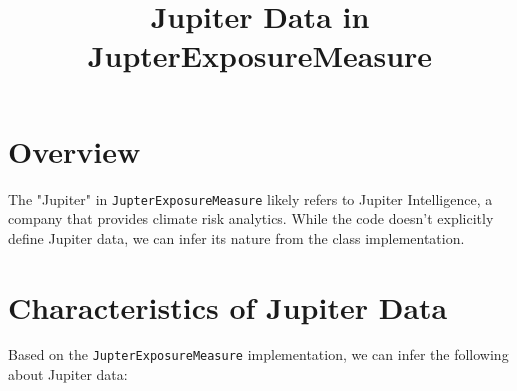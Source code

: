 \documentclass{article}
\title{Jupiter Data in JupterExposureMeasure}
\author{}
\date{}
\begin{document}
\maketitle

\section{Overview}

The "Jupiter" in \texttt{JupterExposureMeasure} likely refers to Jupiter Intelligence, a company that provides climate risk analytics. While the code doesn't explicitly define Jupiter data, we can infer its nature from the class implementation.

\section{Characteristics of Jupiter Data}

Based on the \texttt{JupterExposureMeasure} implementation, we can infer the following about Jupiter data:
\end{document}

